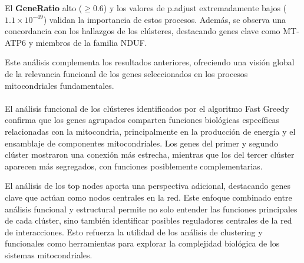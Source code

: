 El \textbf{GeneRatio} alto (\(\geq 0.6\)) y los valores de p.adjust extremadamente bajos (\( 1.1 \times 10^{-49} \)) validan la importancia de estos procesos. Además, se observa una concordancia con los hallazgos de los clústeres, destacando genes clave como MT-ATP6 y miembros de la familia NDUF.

Este análisis complementa los resultados anteriores, ofreciendo una visión global de la relevancia funcional de los genes seleccionados en los procesos mitocondriales fundamentales.

\paragraph{}

El análisis funcional de los clústeres identificados por el algoritmo Fast Greedy confirma que los genes agrupados comparten funciones biológicas específicas relacionadas con la mitocondria, principalmente en la producción de energía y el ensamblaje de componentes mitocondriales. Los genes del primer y segundo clúster mostraron una conexión más estrecha, mientras que los del tercer clúster aparecen más segregados, con funciones posiblemente complementarias.

El análisis de los top nodes aporta una perspectiva adicional, destacando genes clave que actúan como nodos centrales en la red. Este enfoque combinado entre análisis funcional y estructural permite no solo entender las funciones principales de cada clúster, sino también identificar posibles reguladores centrales de la red de interacciones. Esto refuerza la utilidad de los análisis de clustering y funcionales como herramientas para explorar la complejidad biológica de los sistemas mitocondriales.

